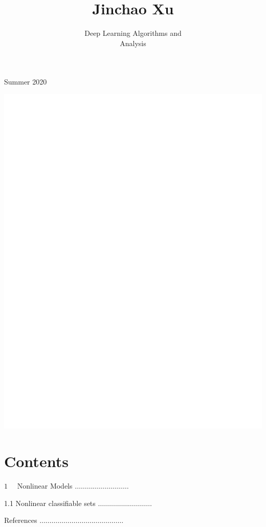 \documentclass[10pt]{article}
\title{Jinchao Xu }
\author{Deep Learning Algorithms and\\
Analysis}
\date{}
\begin{document}
\maketitle

Summer 2020

\includegraphics[max width=\textwidth]{2022_01_05_20c4aca6821d56656c19g-2}

\section{Contents}
$1 \quad$ Nonlinear Models $\ldots \ldots \ldots \ldots \ldots \ldots \ldots \ldots \ldots$

1.1 Nonlinear classifiable sets $\ldots \ldots \ldots \ldots \ldots \ldots \ldots \ldots \ldots$

References $\ldots \ldots \ldots \ldots \ldots \ldots \ldots \ldots \ldots \ldots \ldots \ldots \ldots \ldots$
\end{document}
